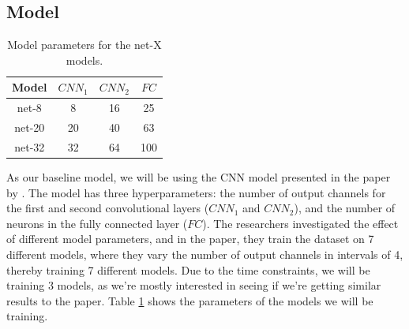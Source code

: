 \documentclass[logo,bsc,singlespacing,parskip,online]{infthesis}
\begin{document}
\subsection{Model}
\label{sec:asa-model}
\begin{table}[h]
   \centering
   \begin{tabular}{|c|c|c|c|}
      \hline
      Model & $CNN_1$ & $CNN_2$ & $FC$ \\
      \hline
      net-8 & 8 & 16 & 25 \\
      net-20 & 20 & 40 & 63 \\
      net-32 & 32 & 64 & 100 \\
      \hline
   \end{tabular}
   \caption{Model parameters for the net-X models.}
   \label{tab:cnn-model-params}
\end{table}
As our baseline model, we will be using the CNN model presented in the paper by \citet{Huwel2020HearDS}. 
The model has three hyperparameters: the number of output channels for the first and second convolutional layers ($CNN_1$ and $CNN_2$),
and the number of neurons in the fully connected layer ($FC$). The researchers investigated the effect of different model parameters, 
and in the paper, they train the dataset on 7 different models, where they vary the number of output channels in intervals of 4, thereby training 7 different models.
Due to the time constraints, we will be training 3 models, as we're mostly interested in seeing if we're getting similar results to the paper.
Table \ref{tab:cnn-model-params} shows the parameters of the models we will be training.
\end{document}
